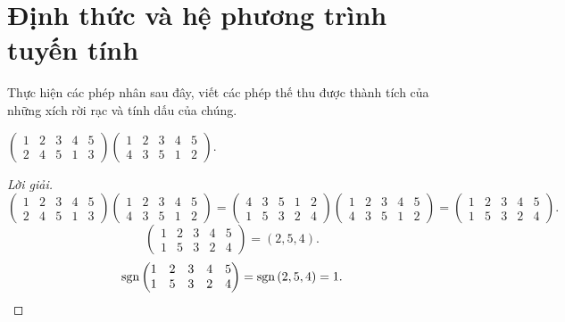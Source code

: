 \chapter{Định thức và hệ phương trình tuyến tính}

Thực hiện các phép nhân sau đây, viết các phép thế thu được thành tích của những xích rời rạc và tính dấu của chúng.

\begin{exercise}
    $
        \begin{pmatrix}
            1 & 2 & 3 & 4 & 5 \\
            2 & 4 & 5 & 1 & 3
        \end{pmatrix}
        \begin{pmatrix}
            1 & 2 & 3 & 4 & 5 \\
            4 & 3 & 5 & 1 & 2
        \end{pmatrix}
    $.
\end{exercise}

\begin{proof}[Lời giải]
    \[
        \begin{pmatrix}
            1 & 2 & 3 & 4 & 5 \\
            2 & 4 & 5 & 1 & 3
        \end{pmatrix}
        \begin{pmatrix}
            1 & 2 & 3 & 4 & 5 \\
            4 & 3 & 5 & 1 & 2
        \end{pmatrix}
        =
        \begin{pmatrix}
            4 & 3 & 5 & 1 & 2 \\
            1 & 5 & 3 & 2 & 4
        \end{pmatrix}
        \begin{pmatrix}
            1 & 2 & 3 & 4 & 5 \\
            4 & 3 & 5 & 1 & 2
        \end{pmatrix}
        =
        \begin{pmatrix}
            1 & 2 & 3 & 4 & 5 \\
            1 & 5 & 3 & 2 & 4
        \end{pmatrix}.
    \]
    \[
        \begin{pmatrix}
            1 & 2 & 3 & 4 & 5 \\
            1 & 5 & 3 & 2 & 4
        \end{pmatrix}
        =
        (2,5,4).
    \]
    \[
        \text{sgn}\left({
            \begin{matrix}
                1 & 2 & 3 & 4 & 5 \\
                1 & 5 & 3 & 2 & 4
            \end{matrix}
        }\right)
        = \text{sgn}\left({2,5,4}\right)
        = 1.
    \]
\end{proof}

